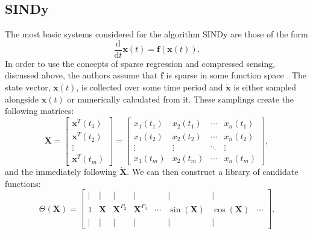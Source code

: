 \documentclass[10pt]{paper}
\begin{document}

\subsection{SINDy} \label{sec:SINDy}
The most basic systems considered for the algorithm SINDy are those of the form 
\[ \frac{\mathrm d}{\mathrm dt} \mathbf x(t) = \mathbf f (\mathbf x(t)). \]
In order to use the concepts of sparse regression and compressed sensing, discussed above, the authors assume that $\mathbf f$ is sparse in some function space \cite{sindy}.
The state vector, $\mathbf x(t)$, is collected over some time period and $\mathbf {\dot x}$ is either sampled alongside $\mathbf x(t)$ or numerically calculated from it. 
These samplings create the following matrices: 
\[ \mathbf X = \begin{bmatrix}
	\mathbf x^T(t_1) \\ \mathbf x^T(t_2) \\ \vdots \\ \mathbf x^T(t_m)
\end{bmatrix} = \begin{bmatrix}
	x_1(t_1) & x_2(t_1) & \cdots & x_n(t_1) \\
	x_1(t_2) & x_2(t_2) & \cdots & x_n(t_2) \\
	\vdots & \vdots & \ddots & \vdots \\ 
	x_1(t_m) & x_2(t_m) & \cdots & x_n(t_m)
\end{bmatrix}, \]  
and the immediately following $\mathbf {\dot X}$. We can then construct a library of candidate functions: 
\[  \Theta(\mathbf X) = \begin{bmatrix} \mid & \mid & \mid & \mid &  & \mid & \mid & \\ 1 & \mathbf X & {\mathbf X}^{P_2} & {\mathbf X}^{P_3} & \cdots & \sin{(\mathbf X)} & \cos{(\mathbf X)} & \cdots \\ \mid & \mid & \mid & \mid & & \mid & \mid & \end{bmatrix}.  \]
\end{document}

